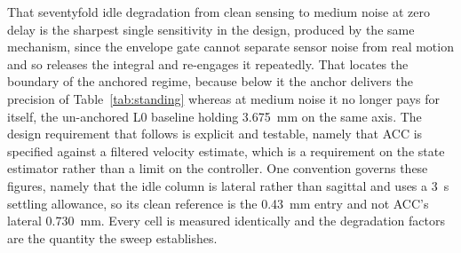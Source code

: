 \documentclass[a4paper,fleqn]{cas-dc}
\begin{document}
That seventyfold idle degradation from clean sensing to medium noise at zero delay is
the sharpest single sensitivity in the design, produced by the same mechanism,
since the envelope gate cannot separate sensor noise from real motion and so
releases the integral and re-engages it repeatedly. That locates the boundary of
the anchored regime, because below it the anchor delivers the precision of
Table~\ref{tab:standing} whereas at medium noise it no longer pays for itself,
the un-anchored L0 baseline holding \SI{3.675}{mm} on the same axis. The design
requirement that follows is explicit and testable, namely that ACC is specified
against a filtered velocity estimate, which is a requirement on the state
estimator rather than a limit on the controller. One convention governs these figures, namely that the idle column is lateral
rather than sagittal and uses a \SI{3}{s} settling allowance, so its clean
reference is the \SI{0.43}{mm} entry and not ACC's lateral \SI{0.730}{mm}. Every
cell is measured identically and the degradation factors are the quantity the
sweep establishes.
\end{document}
